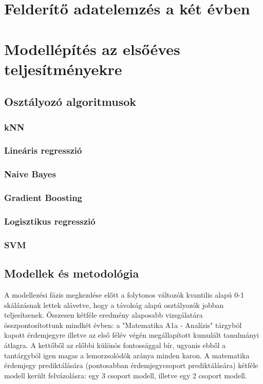 \documentclass[12pt]{article}
\begin{document}
\section{Felderítő adatelemzés a két évben}


\section{Modellépítés az elsőéves teljesítményekre}

\subsection{Osztályozó algoritmusok}

\subsubsection{kNN}

\subsubsection{Lineáris regresszió}

\subsubsection{Naive Bayes}

\subsubsection{Gradient Boosting}

\subsubsection{Logisztikus regresszió}

\subsubsection{SVM}


\subsection{Modellek és metodológia}

A modellezési fázis megkezdése előtt a folytonos változók kvantilis alapú 0-1 skálázásnak lettek alávetve, hogy a távolság alapú osztályozók jobban teljesítsenek. Összesen kétféle eredmény alaposabb vizsgálatára összpontosítottunk mindkét évben: a "Matematika A1a - Analízis" tárgyból kapott érdemjegyre illetve az első félév végén megállapított kumulált tanulmányi átlagra. A kettőből az előbbi különös fontossággal bír, ugyanis ebből a tantárgyból igen magas a lemorzsolódók aránya minden karon. A matematika érdemjegy prediktálására (pontosabban érdemjegycsoport prediktálására) kétféle modell került felvázolásra: egy 3 csoport modell, illetve egy 2 csoport modell.
\end{document}
